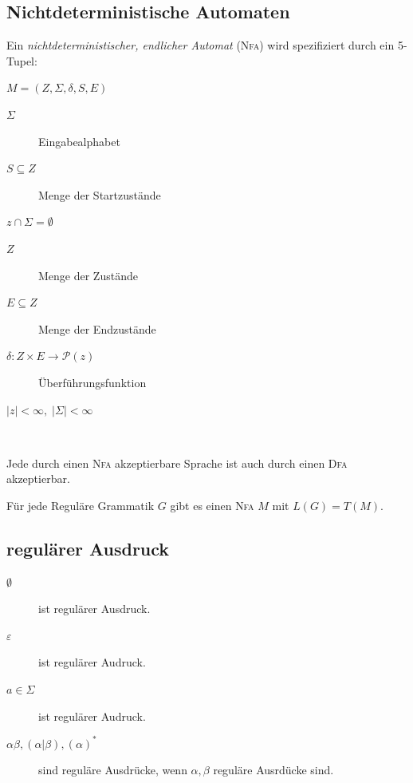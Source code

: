 \documentclass{scrartcl}
\begin{document}
\subsection*{Nichtdeterministische Automaten} %
Ein \emph{nichtdeterministischer, endlicher Automat} (\textsc{Nfa}) wird spezifiziert durch ein 5-Tupel: \\
\begin{minipage}{6cm}
    $M = \left(Z,\Sigma,\delta,S,E\right)$
    \begin{description}
        \item[$\Sigma$] Eingabealphabet
        \item[$S\subseteq Z$] Menge der Startzustände
        \item[$z\cap\Sigma = \emptyset$]
    \end{description}
\end{minipage}
\begin{minipage}{7cm}
\begin{description}
    \item[$Z$] Menge der Zustände
    \item[$E\subseteq Z$] Menge der Endzustände
    \item[$\delta: Z\times E\to \mathcal{P}(z)$] Überführungsfunktion
    \item[$|z|< \infty,\; |\Sigma |<\infty$]
\end{description}
\end{minipage}\\

\begin{shaded}
    Jede durch einen \textsc{Nfa} akzeptierbare Sprache ist auch durch einen \textsc{Dfa} akzeptierbar.
\end{shaded}

\begin{shaded}
    Für jede Reguläre Grammatik $G$ gibt es einen \textsc{Nfa} $M$ mit $L(G)=T(M)$.
\end{shaded}

\subsection*{regulärer Ausdruck} %
\begin{description}
    \item[$\emptyset$] ist regulärer Ausdruck.
    \item[$\varepsilon$] ist regulärer Audruck.
    \item[$a\in\Sigma$] ist regulärer Audruck.
    \item[$\alpha\beta, \left(\alpha\vert\beta\right), \left(\alpha\right)^* $] sind reguläre Ausdrücke, wenn $\alpha,\beta$ reguläre Ausrdücke sind.
\end{description}
\end{document}
